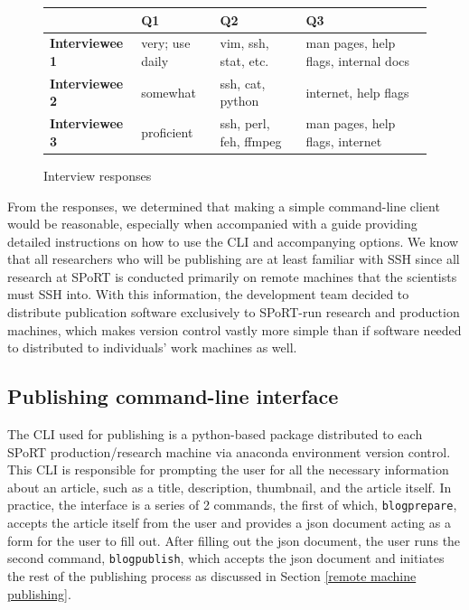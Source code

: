 \documentclass[12pt]{article}
\begin{document}
\vspace{2em}
\begin{figure}[h]
  \centering
  \begin{tabular}{l | l | l | l }
     & \textbf{Q1} & \textbf{Q2} & \textbf{Q3} \\\hline
    \textbf{Interviewee 1} & very; use daily & vim, ssh, stat, etc.  & man pages, help flags, internal docs \\
    \textbf{Interviewee 2} & somewhat & ssh, cat, python & internet, help flags \\
    \textbf{Interviewee 3} & proficient & ssh, perl, feh, ffmpeg & man pages, help flags, internet\\
  \end{tabular}
  \caption{Interview responses}
  \label{results}
\end{figure}

From the responses, we determined that making a simple command-line client would be reasonable, especially when accompanied with a guide \cite{dodson20} providing detailed instructions on how to use the CLI and accompanying options. We know that all researchers who will be publishing are at least familiar with SSH since all research at SPoRT is conducted primarily on remote machines that the scientists must SSH into. With this information, the development team decided to distribute publication software exclusively to SPoRT-run research and production machines, which makes version control vastly more simple than if software needed to distributed to individuals' work machines as well.

\subsection{Publishing command-line interface}
\label{cli interface}

The CLI used for publishing is a python-based package distributed to each SPoRT production/research machine via anaconda environment version control. This CLI is responsible for prompting the user for all the necessary information about an article, such as a title, description, thumbnail, and the article itself. In practice, the interface is a series of 2 commands, the first of which, \texttt{blogprepare}, accepts the article itself from the user and provides a json document acting as a form for the user to fill out. After filling out the json document, the user runs the second command, \texttt{blogpublish}, which accepts the json document and initiates the rest of the publishing process as discussed in Section \ref{remote machine publishing}.
\end{document}
